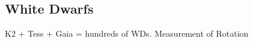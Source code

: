 {\color{red} \subsection{White Dwarfs}}
K2 + Tess + Gaia = hundreds of WDs. Measurement of Rotation  